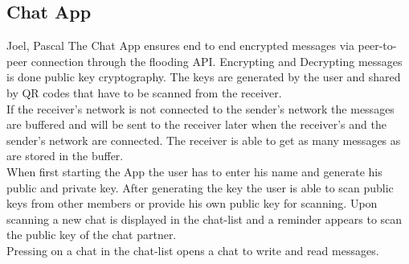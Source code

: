 		\subsection{Chat App}
		Joel, Pascal
			The Chat App ensures end to end encrypted messages via peer-to-peer connection through the flooding API. Encrypting and Decrypting messages is done public key cryptography. The keys are generated by the user and shared by QR codes that have to be scanned from the receiver.\\
			If the receiver's network is not connected to the sender's network the messages are buffered and will be sent to the receiver later when the receiver's and the sender's network are connected. The receiver is able to get as many messages as are stored in the buffer.\\
			When first starting the App the user has to enter his name and generate his public and private key. After generating the key the user is able to scan public keys from other members or provide his own public key for scanning. Upon scanning a new chat is displayed in the chat-list and a reminder appears to scan the public key of the chat partner. \\
			Pressing on a chat in the chat-list opens a chat to write and read messages.\\
